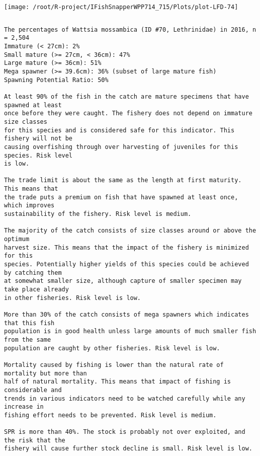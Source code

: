 \documentclass{report}\usepackage[]{graphicx}\usepackage[]{color}
\makeatletter
\def\maxwidth{ %
  \ifdim\Gin@nat@width>\linewidth
    \linewidth
  \else
    \Gin@nat@width
  \fi
}
\newenvironment{kframe}{%
 \def\at@end@of@kframe{}%
 \ifinner\ifhmode%
  \def\at@end@of@kframe{\end{minipage}}%
  \begin{minipage}{\columnwidth}%
 \fi\fi%
 \def\FrameCommand##1{\hskip\@totalleftmargin \hskip-\fboxsep
 \colorbox{shadecolor}{##1}\hskip-\fboxsep
     \hskip-\linewidth \hskip-\@totalleftmargin \hskip\columnwidth}%
 \MakeFramed {\advance\hsize-\width
   \@totalleftmargin\z@ \linewidth\hsize
   \@setminipage}}%
 {\par\unskip\endMakeFramed%
 \at@end@of@kframe}
\newenvironment{knitrout}{}{} %
\makeatother
\begin{document}
\begin{knitrout}
\texttt{[image: /root/R-project/IFishSnapperWPP714\_715/Plots/plot-LFD-74]} 
\begin{kframe}\begin{verbatim}
\end{verbatim}
\end{kframe}
\clearpage
\newpage
\begin{kframe}\begin{verbatim}The percentages of Wattsia mossambica (ID #70, Lethrinidae) in 2016, n = 2,504
Immature (< 27cm): 2%
Small mature (>= 27cm, < 36cm): 47%
Large mature (>= 36cm): 51%
Mega spawner (>= 39.6cm): 36% (subset of large mature fish)
Spawning Potential Ratio: 50%
 
At least 90% of the fish in the catch are mature specimens that have spawned at least
once before they were caught. The fishery does not depend on immature size classes
for this species and is considered safe for this indicator. This fishery will not be
causing overfishing through over harvesting of juveniles for this species. Risk level
is low.

The trade limit is about the same as the length at first maturity.  This means that
the trade puts a premium on fish that have spawned at least once, which improves
sustainability of the fishery. Risk level is medium.

The majority of the catch consists of size classes around or above the optimum
harvest size. This means that the impact of the fishery is minimized for this
species. Potentially higher yields of this species could be achieved by catching them
at somewhat smaller size, although capture of smaller specimen may take place already
in other fisheries. Risk level is low.

More than 30% of the catch consists of mega spawners which indicates that this fish
population is in good health unless large amounts of much smaller fish from the same
population are caught by other fisheries. Risk level is low.
 
Mortality caused by fishing is lower than the natural rate of mortality but more than
half of natural mortality. This means that impact of fishing is considerable and
trends in various indicators need to be watched carefully while any increase in
fishing effort needs to be prevented. Risk level is medium.
 
SPR is more than 40%. The stock is probably not over exploited, and the risk that the
fishery will cause further stock decline is small. Risk level is low.
 

\end{verbatim}
\end{kframe}
\end{knitrout}
\end{document}
